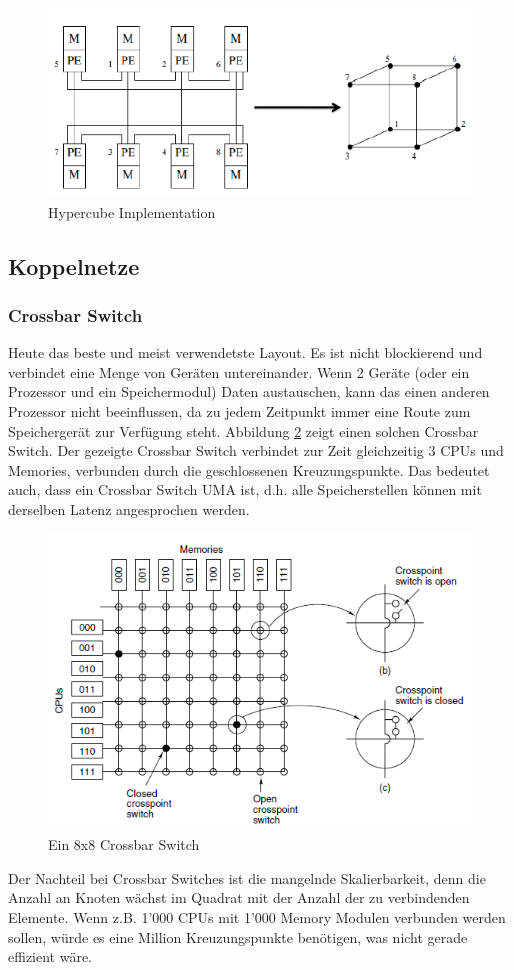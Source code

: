 \begin{figure}[h!]
\centering
\includegraphics[width=0.5\linewidth]{fig/hypercube_impl}
\caption{Hypercube Implementation}
\label{fig:hypercube_impl}
\end{figure}

\subsection{Koppelnetze}

\subsubsection{Crossbar Switch}
Heute das beste und meist verwendetste Layout. Es ist nicht blockierend und verbindet eine Menge von Geräten untereinander. Wenn 2 Geräte (oder ein Prozessor und ein Speichermodul) Daten austauschen, kann das einen anderen Prozessor nicht beeinflussen, da zu jedem Zeitpunkt immer eine Route zum Speichergerät zur Verfügung steht. Abbildung \ref{fig:crossbar_switch} zeigt einen solchen Crossbar Switch. Der gezeigte Crossbar Switch verbindet zur Zeit gleichzeitig 3 CPUs und Memories, verbunden durch die geschlossenen Kreuzungspunkte. Das bedeutet auch, dass ein Crossbar Switch UMA ist, d.h. alle Speicherstellen können mit derselben Latenz angesprochen werden.
\begin{figure}[h!]
\centering
\includegraphics[width=0.5\linewidth]{fig/crossbar_switch}
\caption{Ein 8x8 Crossbar Switch}
\label{fig:crossbar_switch}
\end{figure}

Der Nachteil bei Crossbar Switches ist die mangelnde Skalierbarkeit, denn die Anzahl an Knoten wächst im Quadrat mit der Anzahl der zu verbindenden Elemente. Wenn z.B. 1'000 CPUs mit 1'000 Memory Modulen verbunden werden sollen, würde es eine Million Kreuzungspunkte benötigen, was nicht gerade effizient wäre.

